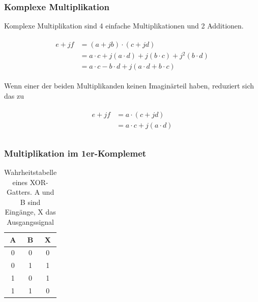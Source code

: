 \begin{frame}\frametitle{Komplexe Multiplikation}

Komplexe Multiplikation sind 4 einfache Multiplikationen und 2 Additionen.

 \begin{align*}\label{eq:komplexe_Multiplikation}
\begin{split}
 e + jf &= (a + jb) \cdot (c + jd)\\
        &= a \cdot c + j(a \cdot d) + j(b \cdot c) + j^2(b \cdot d)\\
        &= a \cdot c - b \cdot d + j(a \cdot d + b \cdot c)
\end{split}
  \end{align*}
  
  Wenn einer der beiden Multiplikanden keinen Imaginärteil haben, reduziert sich das zu 

 \begin{align}\label{eq:halb_komplexe_Multiplikation}
 \begin{split}
  e + jf &= a \cdot (c + jd)\\
         &= a \cdot c + j(a \cdot d)\\
 \end{split}
 \end{align}

\end{frame}


 

\begin{frame}\frametitle{Multiplikation im 1er-Komplemet}



\begin{table}[ht!]
 \centering
 \begin{tabular}{cc|c}
  A& B &X\\
  \hline
  0& 0&0\\
  0& 1&1\\
  1& 0&1\\
  1& 1&0\\
 \end{tabular}
 \caption{Wahrheitstabelle eines XOR-Gatters. A und B sind Eingänge, X das Ausgangssignal}
 \label{tab:xor}
\end{table}

 
\end{frame}


